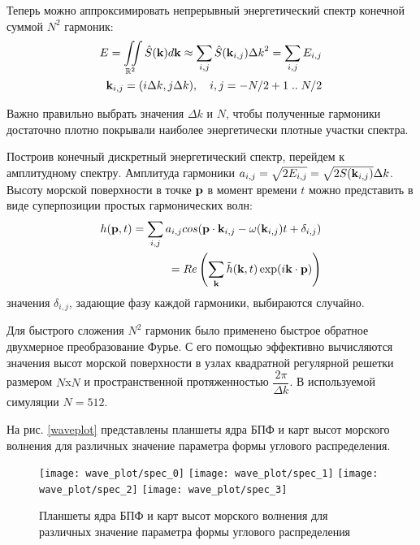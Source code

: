 Теперь можно аппроксимировать непрерывный энергетический спектр конечной суммой $N^2$ гармоник:
\begin{equation}
\begin{split}
E = \iint\limits_{\mathbb{R}^2} \hat{S}(\mathbf{k})d\mathbf{k}
    \approx \sum_{i,j} \hat{S}(\mathbf{k}_{i,j}) {\Delta k}^2 
    = \sum_{i,j} E_{i,j}\\
\mathbf{k}_{i,j} = (i\Delta k, j\Delta k), \quad i,j = -N/2+1 \; .. \; N/2 
\end{split}
\end{equation}

Важно правильно выбрать значения $\Delta k$ и $N$, чтобы полученные гармоники достаточно плотно покрывали наиболее энергетически плотные участки спектра.

Построив конечный дискретный энергетический спектр, перейдем к амплитудному спектру. Амплитуда гармоники $a_{i,j} = \sqrt{2E_{i,j}} = \sqrt{2S(\mathbf{k}_{i,j})}\Delta k$. Высоту морской поверхности в точке $\mathbf{p}$ в момент времени $t$ можно представить в виде суперпозиции простых гармонических волн:
\begin{equation}
\label{wave_height}
\begin{split}
h(\mathbf{p}, t) = \sum_{i,j} a_{i,j}cos(\mathbf{p}\cdot \mathbf{k}_{i,j} - \omega(\mathbf{k}_{i,j})t + \delta_{i,j}) \\
= Re\left( \sum_{\mathbf{k}} \tilde{h}(\mathbf{k}, t)
 \exp(i\mathbf{k} \cdot \mathbf{p}) \right)
\end{split}
\end{equation}
значения $\delta_{i,j}$, задающие фазу каждой гармоники, выбираются случайно.

Для быстрого сложения $N^2$ гармоник было применено быстрое обратное двухмерное преобразование Фурье. С его помощью эффективно вычисляются значения высот морской поверхности в узлах квадратной регулярной решетки размером $N$x$N$ и пространственной протяженностью $\dfrac{2\pi}{\Delta k}$. В используемой симуляции $N = 512$.

На рис. \ref{waveplot} представлены планшеты ядра БПФ и карт высот морского волнения для различных значение параметра формы углового распределения.

\begin{figure}[ht]
\begin{center}
\texttt{[image: wave\_plot/spec\_0]}
\texttt{[image: wave\_plot/spec\_1]}
\texttt{[image: wave\_plot/spec\_2]}
\texttt{[image: wave\_plot/spec\_3]}
\end{center}
\caption{Планшеты ядра БПФ и карт высот морского волнения для различных значение параметра формы углового распределения}
\label{spectrums}
\end{figure}

